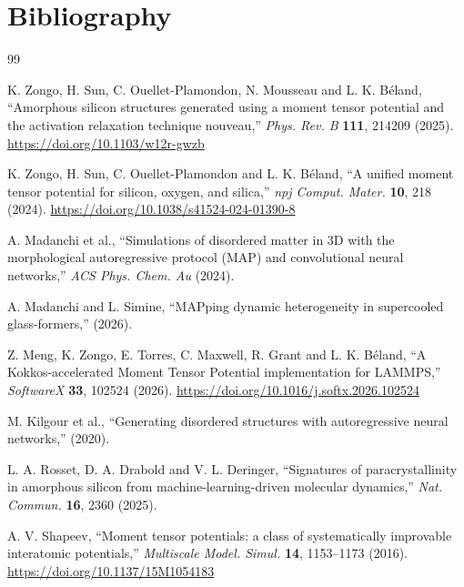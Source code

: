 \documentclass{article}
\begin{document}
\section{Bibliography}
\begin{thebibliography}{99}

 K. Zongo, H. Sun, C. Ouellet-Plamondon, N. Mousseau and
    L. K. Béland, ``Amorphous silicon structures generated using a moment tensor
    potential and the activation relaxation technique nouveau,''
    \textit{Phys. Rev. B} \textbf{111}, 214209 (2025).
    \url{https://doi.org/10.1103/w12r-gwzb}

 K. Zongo, H. Sun, C. Ouellet-Plamondon and L. K. Béland,
    ``A unified moment tensor potential for silicon, oxygen, and silica,''
    \textit{npj Comput. Mater.} \textbf{10}, 218 (2024).
    \url{https://doi.org/10.1038/s41524-024-01390-8}

    A. Madanchi et al., ``Simulations of disordered matter in 3D with the
    morphological autoregressive protocol (MAP) and convolutional neural
    networks,'' \textit{ACS Phys. Chem. Au} (2024).

    A. Madanchi and L. Simine, ``MAPping dynamic heterogeneity in supercooled
    glass-formers,'' (2026).

 Z. Meng, K. Zongo, E. Torres, C. Maxwell, R. Grant and
    L. K. Béland, ``A Kokkos-accelerated Moment Tensor Potential implementation
    for LAMMPS,'' \textit{SoftwareX} \textbf{33}, 102524 (2026).
    \url{https://doi.org/10.1016/j.softx.2026.102524}

    M. Kilgour et al., ``Generating disordered structures with autoregressive
    neural networks,'' (2020).

 L. A. Rosset, D. A. Drabold and V. L. Deringer,
    ``Signatures of paracrystallinity in amorphous silicon from
    machine-learning-driven molecular dynamics,'' \textit{Nat. Commun.}
    \textbf{16}, 2360 (2025).


 A. V. Shapeev, ``Moment tensor potentials: a class of
    systematically improvable interatomic potentials,'' \textit{Multiscale
    Model. Simul.} \textbf{14}, 1153--1173 (2016).
    \url{https://doi.org/10.1137/15M1054183}


\end{thebibliography}
\end{document}

